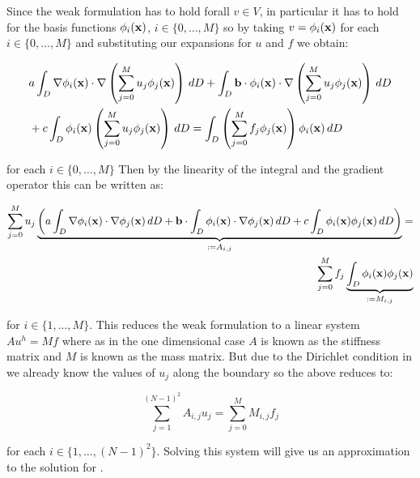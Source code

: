 Since the weak formulation  has to hold forall
$v \in V$, in particular it has to hold for the basis functions
$\phi_i(\mathbf{x})$, $i \in \{0,\ldots,M\}$ so by taking $v = \phi_i(\mathbf{x})$ for
each $i \in \{0, \ldots, M\}$ and substituting our expansions for $u$ and $f$
we obtain:

\begin{align}
\begin{split}
    &a\int_{D}\nabla\phi_i(\mathbf{x}) \cdot
                  \nabla\left(\sum_{j = 0}^Mu_j\phi_j(\mathbf{x})\right)\, dD
    +\int_{D}\mathbf{b}\cdot\phi_i(\mathbf{x})\cdot
                  \nabla\left(\sum_{j = 0}^Mu_j\phi_j(\mathbf{x})\right)\, dD \\
    &+c\int_{D}\phi_i(\mathbf{x})
                    \left(\sum_{j = 0}^Mu_j\phi_j(\mathbf{x})\right)\, dD =
    \int_{D}\left(\sum_{j = 0}^Mf_j\phi_j(\mathbf{x})\right)
                 \phi_i(\mathbf{x})\, dD
\end{split}
\end{align}

for each $i \in \{0, \ldots, M\}$ Then by the linearity of the integral and the
gradient operator this can be written as:

\begin{align}\label{eq:twod-deterministic-discrete}
  \begin{split}
    \sum_{j=0}^Mu_j
      \underbrace{\left(
         a\int_{D}\nabla\phi_i(\mathbf{x})\cdot\nabla\phi_j(\mathbf{x})\, dD
         + \mathbf{b}\cdot\int_{D}\phi_i(\mathbf{x})\cdot\nabla\phi_j(\mathbf{x})\, dD
         +c\int_{D}\phi_i(\mathbf{x})\phi_j(\mathbf{x})\, dD
      \right)}_{:= A_{i,j}} = \\
    \sum_{j=0}^Mf_j
      \underbrace{\int_{D}\phi_i(\mathbf{x})\phi_j(\mathbf{x})}_{:= M_{i,j}}
  \end{split}
\end{align}

for $i \in \{1,\ldots,M\}$. This reduces the weak formulation
 to a linear system $Au^h = Mf$ where as in the
one dimensional case $A$ is known as the stiffness matrix and $M$ is known as
the mass matrix. But due to the Dirichlet condition in
 we already know the values of $u_j$ along the
boundary so the above reduces to:

\begin{equation}
    \sum_{j=1}^{(N-1)^2}A_{i,j}u_j =
    \sum_{j=0}^MM_{i,j}f_j
\end{equation}

for each $i \in \{1, \ldots, (N-1)^2\}$. Solving this system will give us an
approximation to the solution for .

